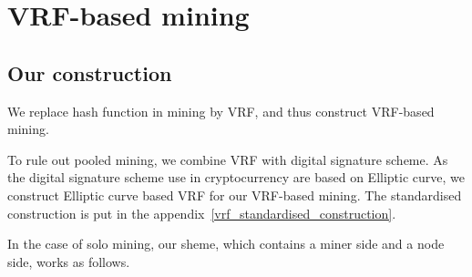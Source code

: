 \section{VRF-based mining}

\subsection{Our construction}

We replace hash function in mining by VRF, and thus construct VRF-based mining.

To rule out pooled mining, we combine VRF with digital signature scheme.
As the digital signature scheme use in cryptocurrency are based on Elliptic curve, we construct Elliptic curve based VRF for our VRF-based mining.
The standardised construction is put in the appendix~\ref{vrf_standardised_construction}.


In the case of solo mining, our sheme, which contains a miner side and a node side, works as follows.

